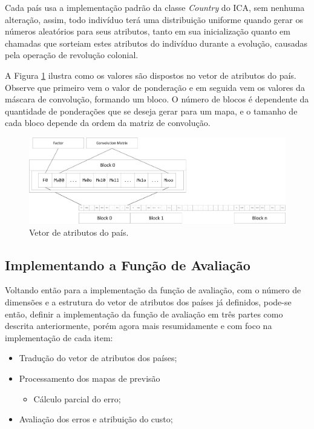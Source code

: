 Cada país usa a implementação padrão da classe \emph{Country} do ICA, sem nenhuma alteração, assim, todo indivíduo terá uma distribuição uniforme quando gerar os números aleatórios para seus atributos, tanto em sua inicialização quanto em chamadas que sorteiam estes atributos do indivíduo durante a evolução, causadas pela operação de revolução colonial.

A Figura \ref{fig:VetorAtributosForecast-Ingles} ilustra como os valores são dispostos no vetor de atributos do país. Observe que primeiro vem o valor de ponderação e em seguida vem os valores da máscara de convolução, formando um bloco. O número de blocos é dependente da quantidade de ponderações que se deseja gerar para um mapa, e o tamanho de cada bloco depende da ordem da matriz de convolução.

\begin{figure}[h]
	\centering	\includegraphics[scale=0.49]{Figuras/VetorAtributosForecast-Ingles.png}
	\caption{Vetor de atributos do país.}
	\label{fig:VetorAtributosForecast-Ingles}
\end{figure}


\subsection{Implementando a Função de Avaliação}
\label{Implementando a Função de Avaliação}

Voltando então para a implementação da função de avaliação, com o número de dimensões e a estrutura do vetor de atributos dos países já definidos, pode-se então, definir a implementação da função de avaliação em três partes como descrita anteriormente, porém agora mais resumidamente e com foco na implementação de cada item:

\begin{itemize}
\item Tradução do vetor de atributos dos países;
\item Processamento dos mapas de previsão 
\begin{itemize}
\item Cálculo parcial do erro;
\end{itemize}
\item Avaliação dos erros e atribuição do custo;
\end{itemize}

